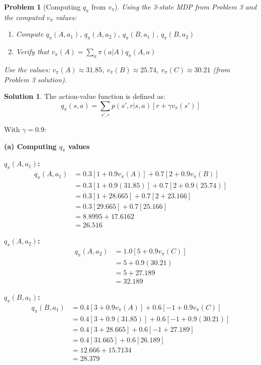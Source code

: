 \documentclass[11pt]{article}
\newtheorem{problem}{Problem}
\theoremstyle{definition}
\newtheorem*{solution}{Solution}
\begin{document}
\newpage

\begin{problem}[Computing $q_\pi$ from $v_\pi$]
Using the 3-state MDP from Problem 3 and the computed $v_\pi$ values:
\begin{enumerate}[label=(\alph*)]
    \item Compute $q_\pi(A, a_1)$, $q_\pi(A, a_2)$, $q_\pi(B, a_1)$, $q_\pi(B, a_2)$
    \item Verify that $v_\pi(A) = \sum_a \pi(a|A) q_\pi(A, a)$
\end{enumerate}

Use the values: $v_\pi(A) \approx 31.85$, $v_\pi(B) \approx 25.74$, $v_\pi(C) \approx 30.21$ (from Problem 3 solution).
\end{problem}

\begin{solution}
The action-value function is defined as:
\[
q_\pi(s,a) = \sum_{s',r} p(s',r|s,a)[r + \gamma v_\pi(s')]
\]

With $\gamma = 0.9$:

\textbf{(a) Computing $q_\pi$ values}

\textbf{$q_\pi(A, a_1)$:}
\begin{align*}
q_\pi(A, a_1) &= 0.3[1 + 0.9 v_\pi(A)] + 0.7[2 + 0.9 v_\pi(B)] \\
&= 0.3[1 + 0.9(31.85)] + 0.7[2 + 0.9(25.74)] \\
&= 0.3[1 + 28.665] + 0.7[2 + 23.166] \\
&= 0.3[29.665] + 0.7[25.166] \\
&= 8.8995 + 17.6162 \\
&= 26.516
\end{align*}

\textbf{$q_\pi(A, a_2)$:}
\begin{align*}
q_\pi(A, a_2) &= 1.0[5 + 0.9 v_\pi(C)] \\
&= 5 + 0.9(30.21) \\
&= 5 + 27.189 \\
&= 32.189
\end{align*}

\textbf{$q_\pi(B, a_1)$:}
\begin{align*}
q_\pi(B, a_1) &= 0.4[3 + 0.9 v_\pi(A)] + 0.6[-1 + 0.9 v_\pi(C)] \\
&= 0.4[3 + 0.9(31.85)] + 0.6[-1 + 0.9(30.21)] \\
&= 0.4[3 + 28.665] + 0.6[-1 + 27.189] \\
&= 0.4[31.665] + 0.6[26.189] \\
&= 12.666 + 15.7134 \\
&= 28.379
\end{align*}


\end{solution}
\end{document}
